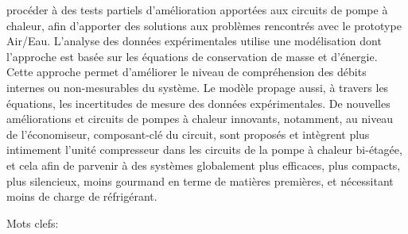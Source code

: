 procéder à des tests partiels d'amélioration apportées aux circuits de
pompe à chaleur, afin d'apporter des solutions aux problèmes
rencontrés avec le prototype Air/Eau. L'analyse des données
expérimentales utilise une modélisation dont l'approche est basée sur
les équations de conservation de masse et d'énergie. Cette approche
permet d'améliorer le niveau de compréhension des débits internes ou
non-mesurables du système. Le modèle propage aussi, à travers les
équations, les incertitudes de mesure des données expérimentales. De
nouvelles améliorations et circuits de pompes à chaleur innovants,
notamment, au niveau de l'économiseur, composant-clé du circuit, sont
proposés et intègrent plus intimement l'unité compresseur dans les
circuits de la pompe à chaleur bi-étagée, et cela afin de parvenir à
des systèmes globalement plus efficaces, plus compacts, plus
silencieux, moins gourmand en terme de matières premières, et
nécessitant moins de charge de réfrigérant.

\vspace{10mm}

Mots clefs:~\varfrkeywords
